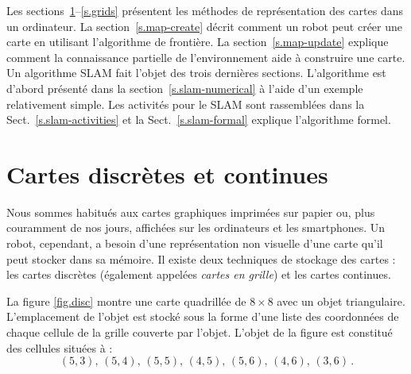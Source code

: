 Les sections~\ref{s.maps}--\ref{s.grids} présentent les méthodes de représentation des cartes dans un ordinateur. La section~\ref{s.map-create} décrit comment un robot peut créer une carte en utilisant l'algorithme de frontière. La section~\ref{s.map-update} explique comment la connaissance partielle de l'environnement aide à construire une carte. Un algorithme SLAM fait l'objet des trois dernières sections.  L'algorithme est d'abord présenté dans la section~\ref{s.slam-numerical} à l'aide d'un exemple relativement simple. Les activités pour le SLAM sont rassemblées dans la Sect.~\ref{s.slam-activities} et la Sect.~\ref{s.slam-formal} explique l'algorithme formel.

\section{Cartes discrètes et continues}\label{s.maps}

Nous sommes habitués aux cartes graphiques imprimées sur papier ou, plus couramment de nos jours, affichées sur les ordinateurs et les smartphones. Un robot, cependant, a besoin d'une représentation non visuelle d'une carte qu'il peut stocker dans sa mémoire. Il existe deux techniques de stockage des cartes : les cartes discrètes (également appelées \emph{cartes en grille}) et les cartes continues.

La figure \ref{fig.disc} montre une carte quadrillée de $8\times 8$ avec un objet triangulaire. L'emplacement de l'objet est stocké sous la forme d'une liste des coordonnées de chaque cellule de la grille couverte par l'objet. L'objet de la figure est constitué des cellules situées à :
\[
(5,3),\, (5,4),\, (5,5),\, (4,5),\, (5,6),\, (4,6),\, (3,6)\,.
\]

